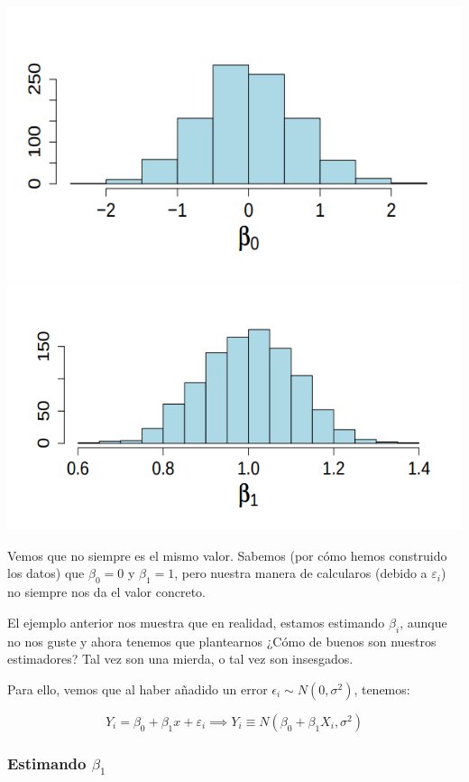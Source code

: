 \begin{example}
\begin{center}
\includegraphics[scale=0.3]{img/1000vecesb0.png}
\includegraphics[scale=0.3]{img/1000vecesb1.png}
\end{center}

Vemos que no siempre es el mismo valor. Sabemos (por cómo hemos construido los datos) que $β_0 = 0$ y $β_1 = 1$, pero nuestra manera de calcularos (debido a $ε_i$) no siempre nos da el valor concreto.


\end{example}

El ejemplo anterior nos muestra que en realidad, estamos estimando $β_i$, aunque no nos guste y ahora tenemos que plantearnos ¿Cómo de buenos son nuestros estimadores? Tal vez son una mierda, o tal vez son insesgados.

Para ello, vemos que al haber añadido un error $\epsilon_i \sim N(0,σ^2)$, tenemos:

\[
Y_i = β_0 + β_1x + ε_i \implies Y_i \equiv N(β_0 + β_1X_i, σ^2)
\]


\subsubsection{Estimando $β_1$}

